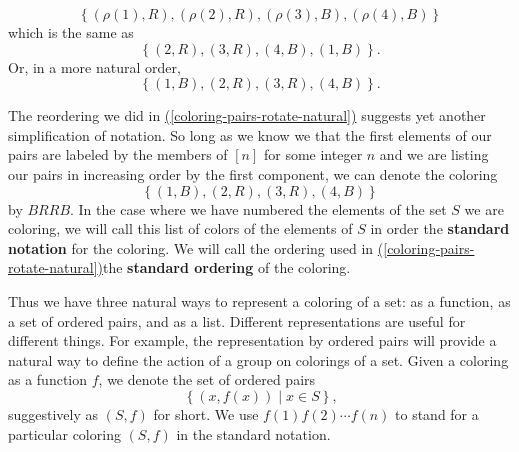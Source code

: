 \documentclass[10pt,]{book}
\newcommand{\terminology}[1]{\textbf{#1}}
\theoremstyle{plain}
\theoremstyle{definition}
\theoremstyle{definition}
\numberwithin{equation}{chapter}
\begin{document}
\begin{equation}
\left\{(\rho(1),R),(\rho(2),R),(\rho(3),B),(\rho(4),B)\right\}\label{coloring-pairs-rotate}
\end{equation}
which is the same as%
\begin{equation*}
\left\{(2,R),(3,R),(4,B),(1,B)\right\}\text{.}
\end{equation*}
Or, in a more natural order,%
\begin{equation}
\left\{(1,B),(2,R),(3,R),(4,B)\right\}\text{.}\label{coloring-pairs-rotate-natural}
\end{equation}
%
\par
The reordering we did in \hyperref[coloring-pairs-rotate-natural]{(\ref{coloring-pairs-rotate-natural})} suggests yet another simplification of notation. So long as we know we that the first elements of our pairs are labeled by the members of \([n]\) for some integer \(n\) and we are listing our pairs in increasing order by the first component, we can denote the coloring%
\begin{equation*}
\left\{(1,B),(2,R),(3,R),(4,B)\right\}
\end{equation*}
by \(BRRB\). In the case where we have numbered the elements of the set \(S\) we are coloring, we will call this list of colors of the elements of \(S\) in order the \terminology{standard notation} for the coloring. We will call the ordering used in \hyperref[coloring-pairs-rotate-natural]{(\ref{coloring-pairs-rotate-natural})}the \terminology{standard ordering} of the coloring. %
\par
Thus we have three natural ways to represent a coloring of a set: as a function, as a set of ordered pairs, and as a list. Different representations are useful for different things. For example, the representation by ordered pairs will provide a natural way to define the action of a group on colorings of a set. Given a coloring as a function \(f\), we denote the set of ordered pairs%
\begin{equation*}
\left\{(x,f(x))\mid x\in S\right\}\text{,}
\end{equation*}
suggestively as \((S,f)\) for short. We use \(f(1)f(2)\cdots f(n)\) to stand for a particular coloring \((S,f)\) in the standard notation.%
\end{document}
